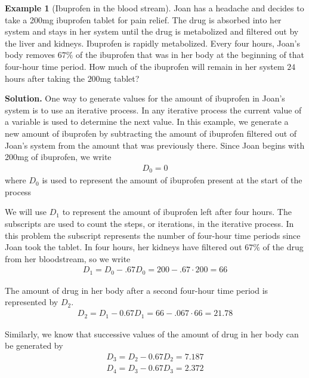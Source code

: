 \documentclass[10pt,]{book}
\theoremstyle{plain}
\theoremstyle{definition}
\theoremstyle{definition}
\newtheorem{example}[theorem]{Example}
\theoremstyle{definition}
\numberwithin{equation}{section}
\begin{document}
\begin{example}[Ibuprofen in the blood stream]\label{ibuprofen-example-one-dose}
\hypertarget{p-6}{}%
Joan has a headache and decides to take a 200mg ibuprofen tablet for pain relief.  The drug is absorbed into her system and stays in her system until the drug is metabolized and filtered out by the liver and kidneys.  Ibuprofen is rapidly metabolized.  Every four hours, Joan's body removes \(67\%\) of the ibuprofen that was in her body at the beginning of that four-hour time period.  How much of the ibuprofen will remain in her system \(24\) hours after taking the \(200\)mg tablet?%
\par\smallskip%
\noindent\textbf{Solution.}\hypertarget{solution-1}{}\quad%
\hypertarget{p-7}{}%
One way to generate values for the amount of ibuprofen in Joan's system is to use an iterative process.  In any iterative process the current value of a variable is used to determine the next value.  In this example, we generate a new amount of ibuprofen by subtracting the amount of ibuprofen filtered out of Joan's system from the amount that was previously there.  Since Joan begins with 200mg of ibuprofen, we write%
\begin{gather*}
D_0=0
\end{gather*}
where \(D_0\) is used to represent the amount of ibuprofen present at the start of the process%
\par
\hypertarget{p-8}{}%
We will use \(D_1\) to represent the amount of ibuprofen left after four hours.  The subscripts are used to count the steps, or iterations,  in the iterative process. In this problem the subscript  represents the number of four-hour time periods since Joan took the tablet.  In four hours, her kidneys have filtered out \(67\%\) of the drug from her bloodstream, so we write%
\begin{gather*}
D_1=D_0-.67D_0=200-.67\cdot 200=66
\end{gather*}
%
\par
\hypertarget{p-9}{}%
The amount of drug in her body after a second four-hour time period is represented by \(D_2\).%
\begin{gather*}
D_2=D_1-0.67D_1=66-.067\cdot 66=21.78
\end{gather*}
%
\par
\hypertarget{p-10}{}%
Similarly, we know that successive values of the amount of drug in her body can be generated by%
\begin{gather*}
D_3=D_2-0.67D_2=7.187\\
D_4=D_3-0.67D_3=2.372

\end{gather*}
\end{example}
\end{document}
